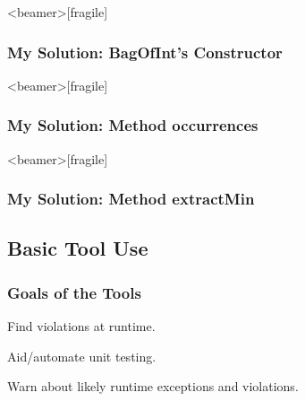 \begin{frame}<beamer>[fragile]
\frametitle{My Solution: BagOfInt's Constructor}


\end{frame}

\begin{frame}<beamer>[fragile]
\frametitle{My Solution: Method occurrences}


\end{frame}

\begin{frame}<beamer>[fragile]
\frametitle{My Solution: Method extractMin}


\end{frame}


\subsection[Tools]{Basic Tool Use}  %

\begin{frame}
\frametitle{Goals of the Tools}
\begin{description}
\item[jmlc:]
Find violations at runtime.

\item[jmlunit:]
Aid/automate unit testing.

\item[ESC/Java2:]
Warn about likely runtime exceptions and violations.
\end{description}
\end{frame}

